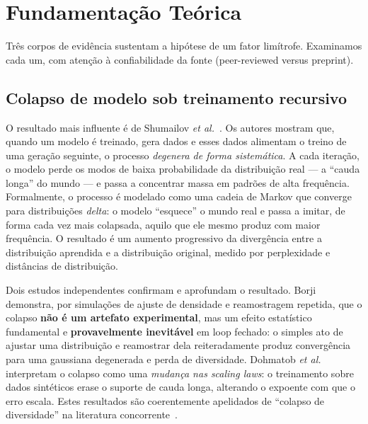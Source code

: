 \section{Fundamentação Teórica}\label{sec:fund}

Três corpos de evidência sustentam a hipótese de um fator limítrofe. Examinamos
cada um, com atenção à confiabilidade da fonte (peer-reviewed versus preprint).

\subsection{Colapso de modelo sob treinamento recursivo}

O resultado mais influente é de Shumailov \textit{et al.}~\parencite
{Shumailov2024Collapse}. Os autores mostram que, quando um modelo é treinado,
gera dados e esses dados alimentam o treino de uma geração seguinte, o processo
\emph{degenera de forma sistemática}. A cada iteração, o modelo perde os modos de
baixa probabilidade da distribuição real --- a ``cauda longa'' do mundo --- e
passa a concentrar massa em padrões de alta frequência. Formalmente, o processo
é modelado como uma cadeia de Markov que converge para distribuições
\emph{delta}: o modelo ``esquece'' o mundo real e passa a imitar, de forma cada
vez mais colapsada, aquilo que ele mesmo produz com maior frequência. O resultado
é um aumento progressivo da divergência entre a distribuição aprendida e a
distribuição original, medido por perplexidade e distâncias de distribuição.

Dois estudos independentes confirmam e aprofundam o resultado. Borji~\parencite
{Borji2024CollapseNote} demonstra, por simulações de ajuste de densidade e
reamostragem repetida, que o colapso \textbf{não é um artefato experimental}, mas
um efeito estatístico fundamental e \textbf{provavelmente inevitável} em loop
fechado: o simples ato de ajustar uma distribuição e reamostrar dela
reiteradamente produz convergência para uma gaussiana degenerada e perda de
diversidade. Dohmatob \textit{et al.}~\parencite{Dohmatob2024CollapseScaling}
interpretam o colapso como uma \emph{mudança nas scaling laws}: o treinamento
sobre dados sintéticos erase o suporte de cauda longa, alterando o expoente com
que o erro escala. Estes resultados são coerentemente apelidados de
``colapso de diversidade'' na literatura
concorrente~\parencite{Alemohammad2024SelfConsuming}.

